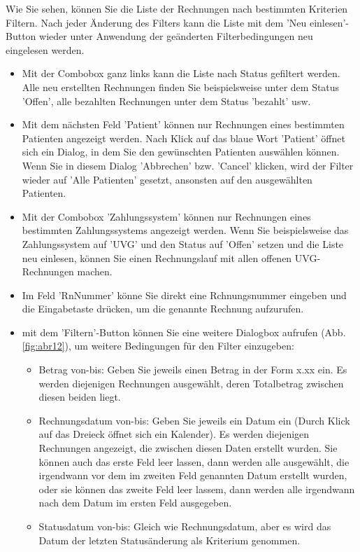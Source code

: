 \documentclass[a4paper]{scrartcl}
\begin{document}
Wie Sie sehen, können Sie die Liste der Rechnungen nach bestimmten Kriterien Filtern. Nach jeder Änderung des Filters kann die Liste mit dem 'Neu einlesen'-Button wieder unter Anwendung der geänderten Filterbedingungen neu eingelesen werden.

\begin{itemize}

\item Mit der Combobox ganz links kann die Liste nach Status gefiltert werden. Alle neu erstellten Rechnungen finden Sie beispielsweise unter dem Status 'Offen', alle bezahlten Rechnungen unter dem Status 'bezahlt' usw.

\item Mit dem nächsten Feld 'Patient' können nur Rechnungen eines bestimmten Patienten angezeigt werden. Nach Klick auf das blaue Wort 'Patient' öffnet sich ein Dialog, in dem Sie den gewünschten Patienten auswählen können. Wenn Sie in diesem Dialog 'Abbrechen' bzw. 'Cancel' klicken, wird der Filter wieder auf 'Alle Patienten' gesetzt, ansonsten auf den ausgewählten Patienten.

\item Mit der Combobox 'Zahlungssystem' können nur Rechnungen eines bestimmten Zahlungssystems angezeigt werden. Wenn Sie beispielsweise das Zahlungssystem auf 'UVG' und den Status auf 'Offen' setzen und die Liste neu einlesen, können Sie einen Rechnungslauf mit allen offenen UVG-Rechnungen machen.

\item Im Feld 'RnNummer' könne Sie direkt eine Rchnungsnummer eingeben und die Eingabetaste drücken, um die genannte Rechnung aufzurufen.

\item mit dem 'Filtern'-Button können Sie eine weitere Dialogbox aufrufen (Abb.\ref{fig:abr12}), um weitere  Bedingungen für den Filter einzugeben:
    \begin{itemize}
    \item Betrag von-bis: Geben Sie jeweils einen Betrag in der Form x.xx ein. Es werden diejenigen Rechnungen ausgewählt, deren Totalbetrag zwischen diesen beiden liegt.
    \item Rechnungsdatum von-bis: Geben Sie jeweils ein Datum ein (Durch Klick auf das Dreieck öffnet sich ein Kalender). Es werden diejenigen Rechnungen angezeigt, die zwischen diesen Daten erstellt wurden. Sie können auch das erste Feld leer lassen, dann werden alle ausgewählt, die irgendwann vor dem im zweiten Feld genannten Datum erstellt wurden, oder sie können das zweite Feld leer lassem, dann werden alle irgendwann nach dem Datum im ersten Feld ausgegeben.
    \item Statusdatum von-bis: Gleich wie Rechnungsdatum, aber es wird das Datum der letzten Statusänderung als Kriterium genommen.
    \end{itemize}

\end{itemize}
\end{document}
